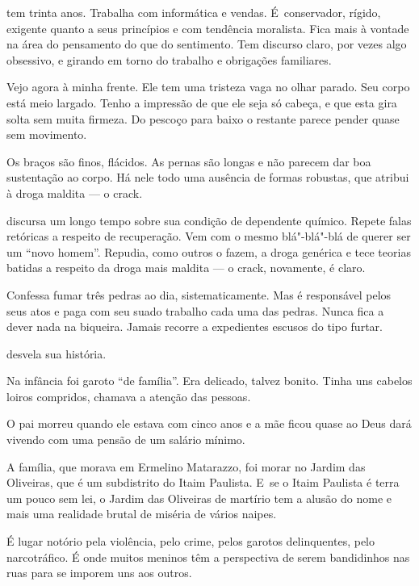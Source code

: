  

 tem trinta anos. Trabalha com informática e vendas. É~conservador,
rígido, exigente quanto a seus princípios e com tendência moralista.
Fica mais à vontade na área do pensamento do que do sentimento. Tem
discurso claro, por vezes algo obsessivo, e girando em torno do trabalho
e obrigações familiares.

Vejo agora  à minha frente. Ele tem uma tristeza vaga no olhar parado.
Seu corpo está meio largado. Tenho a impressão de que ele seja só
cabeça, e que esta gira solta sem muita firmeza. Do pescoço para baixo o
restante parece pender quase sem movimento.

Os braços são finos, flácidos. As pernas são longas e não parecem dar
boa sustentação ao corpo. Há nele todo uma ausência de formas robustas,
que  atribui à droga maldita --- o crack.

\asterisc{}

 discursa um longo tempo sobre sua condição de dependente químico.
Repete falas retóricas a respeito de recuperação. Vem com o mesmo
blá"-blá"-blá de querer ser um ``novo homem''. Repudia, como outros o
fazem, a droga genérica e tece teorias batidas a respeito da droga mais
maldita --- o crack, novamente, é claro.

Confessa fumar três pedras ao dia, sistematicamente. Mas é responsável
pelos seus atos e paga com seu suado trabalho cada uma das pedras. Nunca
fica a dever nada na biqueira. Jamais recorre a expedientes escusos do
tipo furtar.

\asterisc{}

 desvela sua história.

Na infância foi garoto ``de família''. Era delicado, talvez bonito.
Tinha uns cabelos loiros compridos, chamava a atenção das pessoas.

O pai morreu quando ele estava com cinco anos e a mãe ficou quase ao
Deus dará vivendo com uma pensão de um salário mínimo.

A família, que morava em Ermelino Matarazzo, foi morar no Jardim das
Oliveiras, que é um subdistrito do Itaim Paulista. E~se o Itaim
Paulista é terra um pouco sem lei, o Jardim das Oliveiras de martírio
tem a alusão do nome e mais uma realidade brutal de miséria de vários
naipes.

É lugar notório pela violência, pelo crime, pelos garotos delinquentes,
pelo narcotráfico. É onde muitos meninos têm a perspectiva de serem
bandidinhos nas ruas para se imporem uns aos outros.

